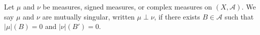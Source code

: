 Let $\mu$ and $\nu$ be measures, signed measures, or complex measures on $(X, \mathcal{A})$. We say $\mu$ and $\nu$ are mutually singular, written $\mu \perp \nu$, if there exists $B \in \mathcal{A}$ such that $|\mu|(B) = 0$ and $|\nu|(B') = 0$.

